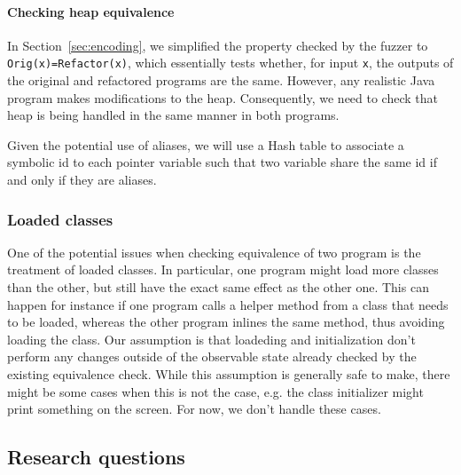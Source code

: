 \documentclass[runningheads,a4paper]{llncs}
\begin{document}
\paragraph{Checking heap equivalence}

In Section~\ref{sec:encoding}, we simplified the property checked by
the fuzzer to \texttt{Orig(x)=Refactor(x)}, which essentially tests
whether, for input \texttt{x}, the outputs of the original and
refactored programs are the same.  However, any realistic Java program
makes modifications to the heap. Consequently, we need to check that
heap is being handled in the same manner in both programs.

Given the potential use of aliases, we will use a Hash table to
associate a symbolic id to each pointer variable such that two
variable share the same id if and only if they are aliases.

\subsubsection{Loaded classes}

One of the potential issues when checking equivalence of two program
is the treatment of loaded classes. In particular, one program might
load more classes than the other, but still have the exact same effect
as the other one. This can happen for instance if one program calls a
helper method from a class that needs to be loaded, whereas the other
program inlines the same method, thus avoiding loading the class.  Our
assumption is that loadeding and initialization don't perform any
changes outside of the observable state already checked by the
existing equivalence check.  While this assumption is generally safe
to make, there might be some cases when this is not the case, e.g. the
class initializer might print something on the screen. For now, we
don't handle these cases.



\subsection{Research questions}
\end{document}
